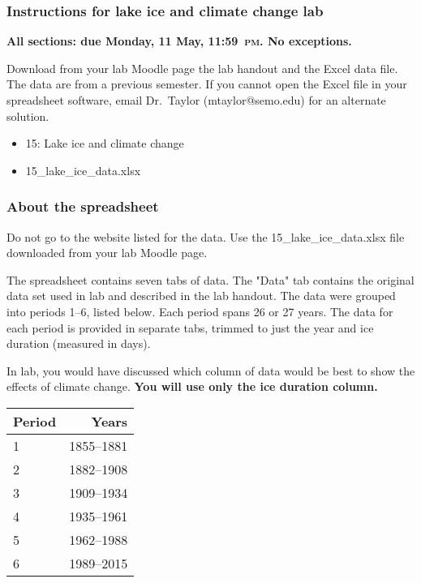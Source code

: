 \documentclass[12pt]{exam}
\begin{document}
\subsubsection*{Instructions for lake ice and climate change lab}

\textbf{All sections: due Monday, 11 May, 11:59~\textsc{pm}. No exceptions.}

Download from your lab Moodle page the lab handout and the Excel data file. The data are from a previous semester. If you cannot open the Excel file in your spreadsheet software, email Dr.~Taylor (mtaylor@semo.edu) for an alternate solution.

\begin{itemize}
\item 15: Lake ice and climate change
\item 15\_lake\_ice\_data.xlsx
\end{itemize}

\subsubsection*{About the spreadsheet}

Do not go to the website listed for the data. 
Use the 15\_lake\_ice\_data.xlsx file downloaded from your lab Moodle page.

The spreadsheet contains seven tabs of data. The "Data" tab contains 
the original data set used in lab and described in the lab handout.  The data were  
grouped into periods 1–6, listed below. Each period spans 26 or 27 
years. The data for each period is provided in separate tabs, trimmed 
to just the year and ice duration (measured in days).

In lab, you would have discussed which column of data would be best
to show the effects of climate change. \textbf{You will use only 
the ice duration column.}

\begin{tabular}{lr}
\toprule
Period & Years \\
\midrule
1 & 1855–1881 \\
2 & 1882–1908 \\
3 & 1909–1934 \\
4 & 1935–1961 \\
5 & 1962–1988 \\
6 & 1989–2015 \\
\bottomrule
\end{tabular}
\end{document}
